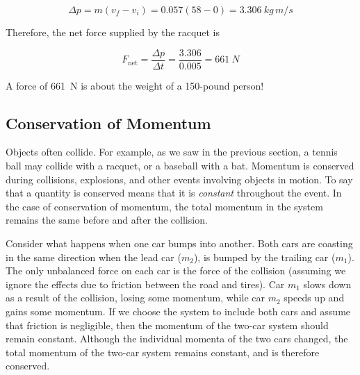 \documentclass[main.tex]{subfiles}
\begin{document}
\begin{equation*}
    \Delta p = m(v_f - v_i) = 0.057(58 - 0) = \SI{3.306}{kg\,m/s}
\end{equation*}

Therefore, the net force supplied by the racquet is

\begin{equation*}
    F_{\text{net}} = \frac{\Delta p}{\Delta t} = \frac{3.306}{0.005} = \SI{661}{N}
\end{equation*}
\vspace{0.1ex}

A force of \SI{661}{N} is about the weight of a 150-pound person!

\solutionEnd    


\cyanhrule


\subsection{Conservation of Momentum} \label{HnP5Pm}
Objects often collide. For example, as we saw in the previous section, a tennis ball may collide with a racquet, or a baseball with a bat. Momentum is conserved during collisions, explosions, and other events involving objects in motion. To say that a quantity is conserved means that it is \textit{constant} throughout the event. In the case of conservation of momentum, the total momentum in the system remains the same before and after the collision.
\vspace{1em}

Consider what happens when one car bumps into another. Both cars are coasting in the same direction when the lead car ($m_2$), is bumped by the trailing car ($m_1$). The only unbalanced force on each car is the force of the collision (assuming we ignore the effects due to friction between the road and tires). Car $m_1$ slows down as a result of the collision, losing some momentum, while car $m_2$ speeds up and gains some momentum. If we choose the system to include both cars and assume that friction is negligible, then the momentum of the two-car system should remain constant. Although the individual momenta of the two cars changed, the total momentum of the two-car system remains constant, and is therefore conserved.
\vspace{1em}
\end{document}
